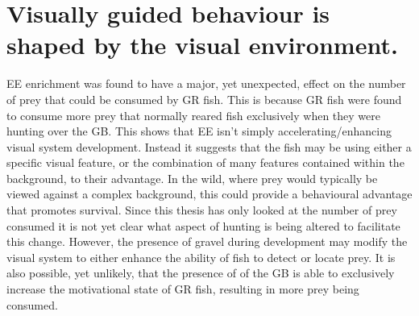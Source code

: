 \section{Visually guided behaviour is shaped by the visual environment.}
EE enrichment was found to have a major, yet unexpected, effect on the number of prey that could be consumed by GR fish. This is because GR fish were found to consume more prey that normally reared fish exclusively when they were hunting over the GB. This shows that EE isn't simply accelerating/enhancing visual system development. Instead it suggests that the fish may be using either a specific visual feature, or the combination of many features contained within the background, to their advantage. In the wild, where prey would typically be viewed against a complex background, this could provide a behavioural advantage that promotes survival. Since this thesis has only looked at the number of prey consumed it is not yet clear what aspect of hunting is being altered to facilitate this change. However, the presence of gravel during development may modify the visual system to either enhance the ability of fish to detect or locate prey. It is also possible, yet unlikely, that the presence of of the GB is able to exclusively increase the motivational state of GR fish, resulting in more prey being consumed.

